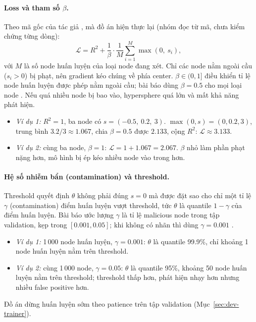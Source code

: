 \paragraph{Loss và tham số $\beta$.}
Theo mã gốc của tác giả \cite{ocrapt_repo}, mà đồ án hiện thực lại (nhóm đọc từ mã, chưa kiểm chứng từng dòng):
\[
\mathcal{L} = R^2 + \frac{1}{\beta} \cdot \frac{1}{M} \sum_{i=1}^{M} \max(0,\ s_i),
\]
với $M$ là số node huấn luyện của loại node đang xét. Chỉ các node nằm ngoài cầu ($s_i > 0$) bị phạt, nên gradient kéo chúng về phía center. $\beta \in (0, 1]$ điều khiển tỉ lệ node huấn luyện được phép nằm ngoài cầu; bài báo dùng $\beta = 0.5$ cho mọi loại node \cite{aly2025ocrapt}. Nếu quá nhiều node bị bao vào, hypersphere quá lớn và mất khả năng phát hiện.
\begin{itemize}
    \item \emph{Ví dụ 1:} $R^2 = 1$, ba node có $s = (-0.5,\ 0.2,\ 3)$. $\max(0, s) = (0, 0.2, 3)$, trung bình $3.2/3 \approx 1.067$, chia $\beta = 0.5$ được $2.133$, cộng $R^2$: $\mathcal{L} \approx 3.133$.
    \item \emph{Ví dụ 2:} cùng ba node, $\beta = 1$: $\mathcal{L} = 1 + 1.067 = 2.067$. $\beta$ nhỏ làm phần phạt nặng hơn, mô hình bị ép kéo nhiều node vào trong hơn.
\end{itemize}

\paragraph{Hệ số nhiễm bẩn (contamination) và threshold.}
Threshold quyết định $\theta$ không phải đúng $s = 0$ mà được đặt sao cho chỉ một tỉ lệ $\gamma$ (contamination) điểm huấn luyện vượt threshold, tức $\theta$ là quantile $1 - \gamma$ của điểm huấn luyện. Bài báo ước lượng $\gamma$ là tỉ lệ malicious node trong tập validation, kẹp trong $[0.001, 0.05]$; khi không có nhãn thì dùng $\gamma = 0.001$ \cite[§5.1.2, §7.2.1]{aly2025ocrapt}.
\begin{itemize}
    \item \emph{Ví dụ 1:} 1\,000 node huấn luyện, $\gamma = 0.001$: $\theta$ là quantile 99.9\%, chỉ khoảng 1 node huấn luyện nằm trên threshold.
    \item \emph{Ví dụ 2:} cùng 1\,000 node, $\gamma = 0.05$: $\theta$ là quantile 95\%, khoảng 50 node huấn luyện nằm trên threshold; threshold thấp hơn, phát hiện nhạy hơn nhưng nhiều false positive hơn.
\end{itemize}
Đồ án dừng huấn luyện sớm theo patience trên tập validation (Mục~\ref{sec:dev-trainer}).

